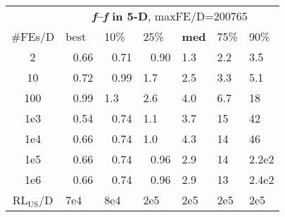 \begin{tabular}{c|llllll}
 & \multicolumn{6}{|c}{\textbf{\textit{f}\raisebox{-0.35ex}{1}--\textit{f}\raisebox{-0.35ex}{24} in 5-D}, maxFE/D=200765}\\
\#FEs/D & best & 10\% & 25\% & \textbf{med} & 75\% & 90\%\\
2 & ~\,0.66 & ~\,0.71 & ~\,0.90 & \hspace*{1ex}1.3 & \hspace*{1ex}2.2 & \hspace*{1ex}3.5\\
10 & ~\,0.72 & ~\,0.99 & \hspace*{1ex}1.7 & \hspace*{1ex}2.5 & \hspace*{1ex}3.3 & \hspace*{1ex}5.1\\
100 & ~\,0.99 & \hspace*{1ex}1.3 & \hspace*{1ex}2.6 & \hspace*{1ex}4.0 & \hspace*{1ex}6.7 & 18\\
1e3 & ~\,0.54 & ~\,0.74 & \hspace*{1ex}1.1 & \hspace*{1ex}3.7 & 15 & 42\\
1e4 & ~\,0.66 & ~\,0.74 & \hspace*{1ex}1.0 & \hspace*{1ex}4.3 & 14 & 46\\
1e5 & ~\,0.66 & ~\,0.74 & ~\,0.96 & \hspace*{1ex}2.9 & 14 & 2.2e2\\
1e6 & ~\,0.66 & ~\,0.74 & ~\,0.96 & \hspace*{1ex}2.9 & 13 & 2.4e2\\
$\text{RL}_{\text{US}}$/D & 7e4 & 8e4 & 2e5 & 2e5 & 2e5 & 2e5
\end{tabular}
